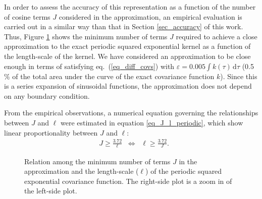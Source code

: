 In order to assess the accuracy of this representation as a function of the number of cosine terms $J$ considered in the approximation, an empirical evaluation is carried out in a similar way than that in Section \ref{sec_accuracy} of this work. Thus, Figure \ref{figB1_m_lscale_periodic} shows the minimum number of terms $J$ required to achieve a close approximation to the exact periodic squared exponential kernel as a function of the length-scale of the kernel. We have considered an approximation to be close enough in terms of satisfying eq.~(\ref{eq_diff_covs}) with $\varepsilon=0.005 \int k(\tau) \,\mathrm{d}\tau$ (0.5$\%$ of the total area under the curve of the exact covariance function $k$). Since this is a series expansion of sinusoidal functions, the approximation does not depend on any boundary condition.

From the empirical observations, a numerical equation governing the relationships between $J$ and $\ell$ were estimated in equation \ref{eq_J_l_periodic}, which show linear proportionality between $J$ and $\ell$:
%
\begin{align}\label{eq_J_l_periodic}
&J \geq \frac{3.72}{\ell} \;\; \Leftrightarrow \;\; \ell \geq \frac{3.72}{J}.
\end{align}

\begin{figure}
\centering
{}
\hspace{3mm}
\caption{Relation among the minimum number of terms $J$ in the approximation and the length-scale ($\ell$) of the periodic squared exponential covariance function. The right-side plot is a zoom in of the left-side plot.}
  \label{figB1_m_lscale_periodic}
\end{figure}


